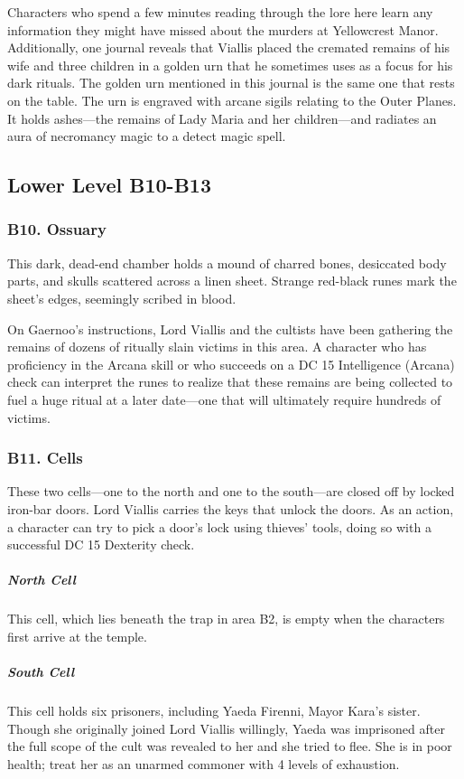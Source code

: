 \documentclass[10pt,a4paper,twoside,bg=print,twocolumn,openany,nodeprecatedcode]{dndbook}
\begin{document}
Characters who spend a few minutes reading through the lore here learn any information they might have missed about the murders at Yellowcrest Manor. Additionally, one journal reveals that Viallis placed the cremated remains of his wife and three children in a golden urn that he sometimes uses as a focus for his dark rituals. The golden urn mentioned in this journal is the same one that rests on the table. The urn is engraved with arcane sigils relating to the Outer Planes. It holds ashes—the remains of Lady Maria and her children—and radiates an aura of necromancy magic to a detect magic spell.

\subsection{Lower Level B10-B13}
\subsubsection{B10. Ossuary}
\begin{DndReadAloud}{}
This dark, dead-end chamber holds a mound of charred bones, desiccated body parts, and skulls scattered across a linen sheet. Strange red-black runes mark the sheet's edges, seemingly scribed in blood.

\end{DndReadAloud}

On Gaernoo's instructions, Lord Viallis and the cultists have been gathering the remains of dozens of ritually slain victims in this area. A character who has proficiency in the Arcana skill or who succeeds on a DC 15 Intelligence (Arcana) check can interpret the runes to realize that these remains are being collected to fuel a huge ritual at a later date—one that will ultimately require hundreds of victims.

\subsubsection{B11. Cells}
These two cells—one to the north and one to the south—are closed off by locked iron-bar doors. Lord Viallis carries the keys that unlock the doors. As an action, a character can try to pick a door's lock using thieves' tools, doing so with a successful DC 15 Dexterity check.

\subparagraph{North Cell}
This cell, which lies beneath the trap in area B2, is empty when the characters first arrive at the temple.

\subparagraph{South Cell}
This cell holds six prisoners, including Yaeda Firenni, Mayor Kara's sister. Though she originally joined Lord Viallis willingly, Yaeda was imprisoned after the full scope of the cult was revealed to her and she tried to flee. She is in poor health; treat her as an unarmed commoner with 4 levels of exhaustion.
\end{document}
